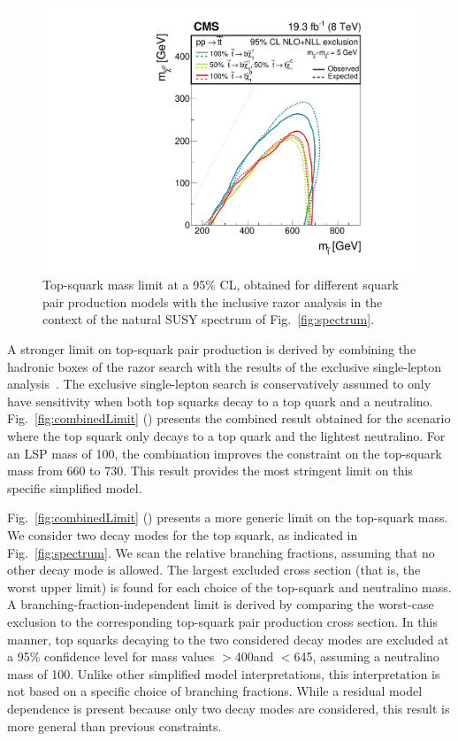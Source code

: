 \begin{figure}[tb!]
\centering
 \includegraphics[width=\cmsFigWidth]{figs/analysis8TeV/T2HybridNew0Lp1Lp2LBARE.pdf}
 \caption{Top-squark mass limit at a 95\% CL, obtained for different
   squark pair production models with the inclusive razor analysis in the
   context of the natural SUSY spectrum of
   Fig.~\ref{fig:spectrum}.\label{fig:stopSUMMARY}}

\end{figure}

A stronger limit on top-squark pair production is derived by combining
the hadronic boxes of the razor search with the results of the
exclusive single-lepton analysis~\cite{1LepMVA}. The exclusive
single-lepton search is conservatively assumed to only have
sensitivity when both top squarks decay to a top quark and a
neutralino. Fig.~\ref{fig:combinedLimit} (\cmsLeft) presents the combined result obtained for the scenario where the top
squark only decays to a top quark and the lightest neutralino. For an
LSP mass of 100\GeV, the combination improves the constraint on the
top-squark mass from 660 to 730\GeV. This result provides the
most stringent limit on this specific simplified model.


Fig.~\ref{fig:combinedLimit} (\cmsRight) presents a more generic limit on the
top-squark mass. We consider two decay modes for the top squark, as
indicated in Fig.~\ref{fig:spectrum}. We scan the relative branching
fractions, assuming that no other decay mode is allowed. The largest
excluded cross section (that is, the worst upper limit) is found for
each choice of the top-squark and neutralino mass. A
branching-fraction-independent limit is derived by comparing the
worst-case exclusion to the corresponding top-squark pair production
cross section. In this manner, top squarks decaying to the two
considered decay modes are excluded at a 95\% confidence level for
mass values $>$400\GeV and $<$645\GeV, assuming a neutralino mass of
100\GeV. Unlike other simplified model interpretations, this
interpretation is not based on a specific choice of branching
fractions. While a residual model dependence is present because only
two decay modes are considered, this result is more general than
previous constraints.

